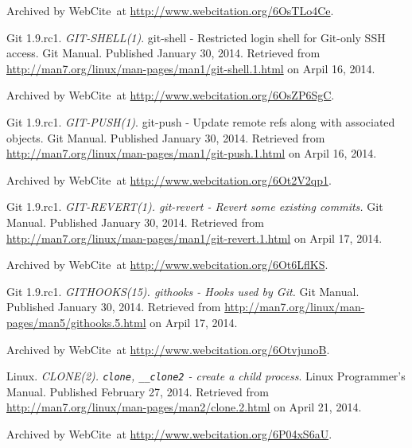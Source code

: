 \begin{thebibliography}{9}
Archived by WebCite\textsuperscript{\textregistered}\ at
\url{http://www.webcitation.org/6OsTLo4Ce}.


Git 1.9.rc1. \emph{GIT-SHELL(1)}. git-shell - Restricted login shell for
Git-only SSH access. Git Manual. Published January 30, 2014. Retrieved from
\url{http://man7.org/linux/man-pages/man1/git-shell.1.html} on Arpil 16, 2014.

Archived by WebCite\textsuperscript{\textregistered}\ at
\url{http://www.webcitation.org/6OsZP6SgC}.


Git 1.9.rc1. \emph{GIT-PUSH(1)}. git-push - Update remote refs along with
associated objects. Git Manual. Published January 30, 2014. Retrieved from
\url{http://man7.org/linux/man-pages/man1/git-push.1.html} on Arpil 16, 2014.

Archived by WebCite\textsuperscript{\textregistered}\ at
\url{http://www.webcitation.org/6Ot2V2qp1}.


Git 1.9.rc1. \emph{GIT-REVERT(1). git-revert - Revert some existing commits.}
Git Manual. Published January 30, 2014. Retrieved from
\url{http://man7.org/linux/man-pages/man1/git-revert.1.html} on Arpil 17, 2014.

Archived by WebCite\textsuperscript{\textregistered}\ at
\url{http://www.webcitation.org/6Ot6LflKS}.


Git 1.9.rc1. \emph{GITHOOKS(15). githooks - Hooks used by Git.} Git Manual.
Published January 30, 2014. Retrieved from
\url{http://man7.org/linux/man-pages/man5/githooks.5.html} on Arpil 17, 2014.

Archived by WebCite\textsuperscript{\textregistered}\ at
\url{http://www.webcitation.org/6OtvjunoB}.


Linux. \emph{CLONE(2). \texttt{clone}, \texttt{\_\_clone2} - create a child
process}. Linux Programmer's Manual. Published February 27, 2014. Retrieved
from \url{http://man7.org/linux/man-pages/man2/clone.2.html} on April 21, 2014.

Archived by WebCite\textsuperscript{\textregistered}\ at
\url{http://www.webcitation.org/6P04xS6aU}.



\end{thebibliography}
